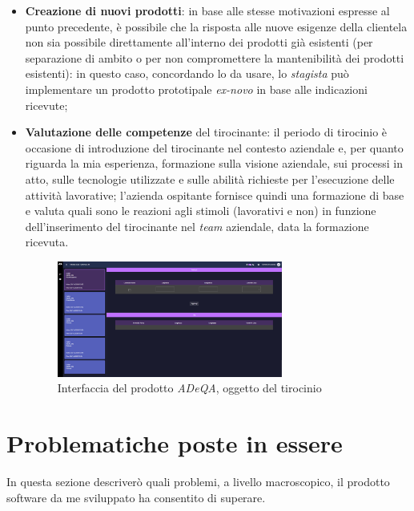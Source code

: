 \begin{itemize}
\begin{figure}[H]
        \end{figure}
    \item \textbf{Creazione di nuovi prodotti}: in base alle stesse motivazioni espresse al punto precedente, è possibile che la risposta alle nuove esigenze della clientela non sia possibile direttamente all'interno dei prodotti già esistenti (per separazione di ambito o 
        per non compromettere la mantenibilità dei prodotti esistenti): in questo caso, concordando lo  da usare, lo \textit{stagista} può implementare un prodotto prototipale \textit{ex-novo} in base alle indicazioni ricevute;
    \item \textbf{Valutazione delle competenze} del tirocinante: il periodo di tirocinio è occasione di introduzione del tirocinante nel contesto aziendale e, per quanto riguarda la mia esperienza, formazione sulla visione aziendale, sui processi in atto, sulle tecnologie utilizzate 
        e sulle abilità richieste per l'esecuzione delle attività lavorative; l'azienda ospitante fornisce quindi una formazione di base e valuta quali sono le reazioni agli stimoli (lavorativi e non) in funzione dell'inserimento del tirocinante nel \textit{team} aziendale, data la formazione ricevuta.
        \begin{figure}[H]
            \centering
            \includegraphics[width=0.7\textwidth]{images/dashboard.png}
            \caption[Interfaccia del prodotto \textit{ADeQA}]{Interfaccia del prodotto \textit{ADeQA}, oggetto del tirocinio}
        \end{figure}
\end{itemize}
\section{Problematiche poste in essere}

In questa sezione descriverò quali problemi, a livello macroscopico, il prodotto software da me sviluppato ha consentito di superare.

